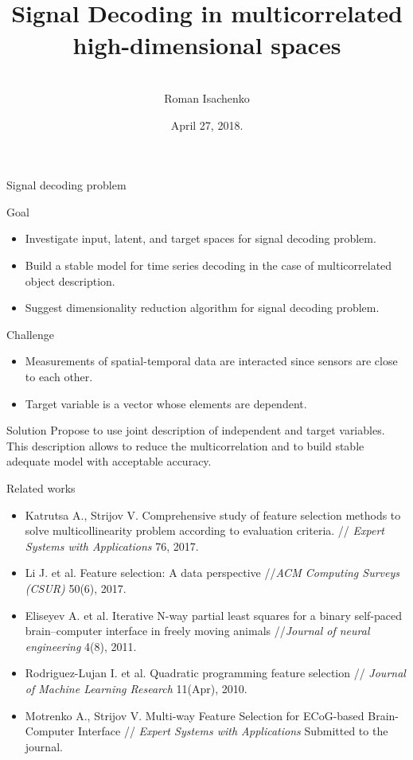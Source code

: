 \documentclass[9pt]{beamer}
\title[\hbox to 56mm{  \hfill\insertframenumber\,/\,\inserttotalframenumber}]
{\\ \vspace{1.5cm} Signal Decoding in multicorrelated high-dimensional spaces}
\author[Roman Isachenko]{\\ 
	\vspace{.4cm}
	Roman Isachenko}
\institute[SkolTech]{Skoltech advisor: Maxim Fedorov \\ 
	\vspace{0.1cm}
	 MIPT advisor: Vadim Strijov
}
\date{April 27, 2018.}
\begin{document}
\begin{frame}
\titlepage
\end{frame}
\begin{frame}{Signal decoding problem}
	\begin{block}{Goal}
		\begin{itemize}
			\item Investigate input, latent, and target spaces for signal decoding problem.
			\item Build a stable model for time series decoding in the case of multicorrelated object description.
			\item Suggest dimensionality reduction algorithm for signal decoding problem.
		\end{itemize}
	\end{block}
	\begin{block}{Challenge}
		\begin{itemize}
			\item Measurements of spatial-temporal data are interacted since sensors are close to each other.
			\item Target variable is a vector whose elements are dependent.
		\end{itemize}
	\end{block}
	\begin{block}{Solution}
		Propose to use joint description of independent and target variables. This description allows to reduce the multicorrelation and to build stable adequate model with acceptable accuracy.
	\end{block}
\end{frame}
\begin{frame}{Related works}
	\begin{itemize}
		\item Katrutsa A., Strijov V. Comprehensive study of feature selection methods to solve multicollinearity problem according to evaluation criteria. // \textit{Expert Systems with Applications} 76, 2017.
		\vfill
		\item Li J. et al. Feature selection: A data perspective //\textit{ACM Computing Surveys (CSUR)} 50(6), 2017.
		\vfill
		\item Eliseyev A. et al. Iterative N-way partial least squares for a binary self-paced brain–computer interface in freely moving animals //\textit{Journal of neural engineering} 4(8), 2011.
		\vfill
		\item Rodriguez-Lujan I. et al. Quadratic programming feature selection // \textit{Journal of Machine Learning Research} 11(Apr), 2010.
		\vfill
		\item Motrenko A., Strijov V. Multi-way Feature Selection for ECoG-based Brain-Computer Interface // \textit{Expert Systems with Applications} Submitted to the journal.
	\end{itemize}
\end{frame}
\end{document}
